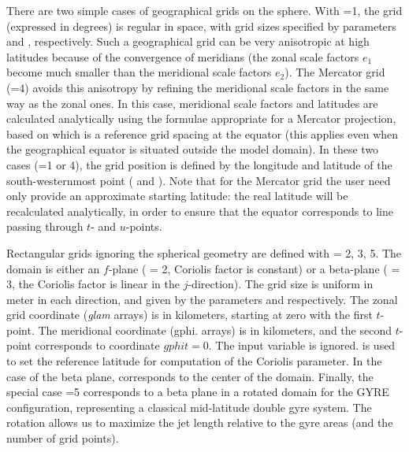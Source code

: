 \documentclass[NEMO_book]{subfiles}
\begin{document}
There are two simple cases of geographical grids on the sphere. With 
=1, the grid (expressed in degrees) is regular in space, 
with grid sizes specified by parameters  and , 
respectively. Such a geographical grid can be very anisotropic at high latitudes 
because of the convergence of meridians (the zonal scale factors $e_1$ 
become much smaller than the meridional scale factors $e_2$). The Mercator 
grid (=4) avoids this anisotropy by refining the meridional scale 
factors in the same way as the zonal ones. In this case, meridional scale factors 
and latitudes are calculated analytically using the formulae appropriate for 
a Mercator projection, based on  which is a reference grid spacing 
at the equator (this applies even when the geographical equator is situated outside 
the model domain). 
In these two cases (=1 or 4), the grid position is defined by the 
longitude and latitude of the south-westernmost point ( 
and ). Note that for the Mercator grid the user need only provide 
an approximate starting latitude: the real latitude will be recalculated analytically, 
in order to ensure that the equator corresponds to line passing through $t$- 
and $u$-points.  

Rectangular grids ignoring the spherical geometry are defined with 
 = 2, 3, 5. The domain is either an $f$-plane ( = 2, 
Coriolis factor is constant) or a beta-plane ( = 3, the Coriolis factor 
is linear in the $j$-direction). The grid size is uniform in meter in each direction, 
and given by the parameters  and  respectively. 
The zonal grid coordinate (\textit{glam} arrays) is in kilometers, starting at zero 
with the first $t$-point. The meridional coordinate (gphi. arrays) is in kilometers, 
and the second $t$-point corresponds to coordinate $gphit=0$. The input 
variable  is ignored.  is used to set the reference 
latitude for computation of the Coriolis parameter. In the case of the beta plane, 
 corresponds to the center of the domain. Finally, the special case 
=5 corresponds to a beta plane in a rotated domain for the 
GYRE configuration, representing a classical mid-latitude double gyre system. 
The rotation allows us to maximize the jet length relative to the gyre areas 
(and the number of grid points). 
\end{document}
